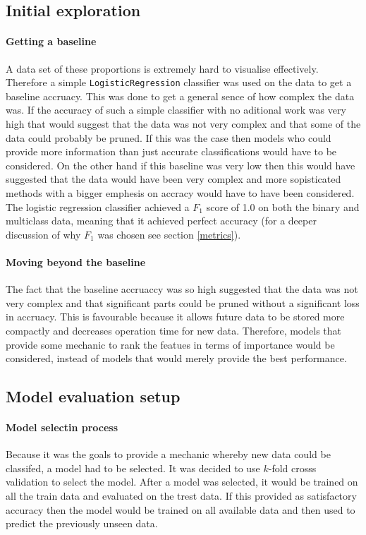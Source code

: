 \documentclass[british]{article}
\newcommand{\code}[1]{\texttt{#1}}
\begin{document}
\subsection{Initial exploration}


\paragraph{Getting a baseline}A data set of these proportions is extremely hard to visualise effectively. Therefore a simple \code{LogisticRegression} classifier was used on the data to get a baseline accruacy. This was done to get a general sence of how complex the data was. If the accuracy of such a simple classifier with no aditional work was very high that would suggest that the data was not very complex and that some of the data could probably be pruned. If this was the case then models who could provide more information than just accurate classifications would have to be considered. On the other hand if this baseline was very low then this would have suggested that the data would have been very complex and more sopisticated methods with a bigger emphesis on accracy would have to have been considered. The logistic regression classifier achieved a $F_1$ score of 1.0 on both the binary and multiclass data, meaning that it achieved perfect accuracy (for a deeper discussion of why $F_1$ was chosen see section \ref{metrics}).


\paragraph{Moving beyond the baseline} The fact that the baseline accruaccy was so high suggested that the data was not very complex and that significant parts could be pruned without a significant loss in accruacy. This is favourable because it allows future data to be stored more compactly and decreases operation time for new data. Therefore, models that provide some mechanic to rank the featues in terms of importance would be considered, instead of models that would merely provide the best performance. 


\subsection{Model evaluation setup}
\paragraph{Model selectin process} Because it was the goals to provide a mechanic whereby new data could be classifed, a model had to be selected. It was decided to use $k$-fold crosss validation to select the model. After a model was selected, it would be trained on all the train data and evaluated on the trest data. If this provided as satisfactory accuracy then the model would be trained on all available data and then used to predict the previously unseen data. 
\end{document}
